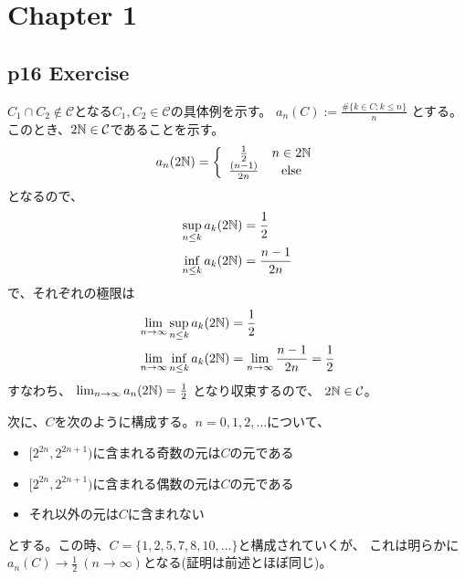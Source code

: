 
\section{Chapter 1}
    \subsection{p16 Exercise}
        $C_1\cap C_2\not\in\mathcal{C}$となる$C_1, C_2\in\mathcal{C}$の具体例を示す。
        $a_n(C) := \frac{\#\{k\in C; k\leq n\}}{n}$
        とする。このとき、$2{\mathbb{N}}\in\mathcal{C}$であることを示す。
        \begin{align*}
            a_n(2{\mathbb{N}}) = \left \{
            \begin{array}{cc}
                \frac{1}{2} & n\in 2{\mathbb{N}}\\
                \frac{(n-1)}{2 n} & \mathrm{else}
            \end{array}
            \right.
        \end{align*}
        となるので、
        \begin{align*}
            \sup_{n\leq k} a_k(2{\mathbb{N}}) &= \frac{1}{2} \\
            \inf_{n\leq k} a_k(2{\mathbb{N}}) &= \frac{n-1}{2n}
        \end{align*}
        で、それぞれの極限は
        \begin{align*}
            \lim_{n\to\infty}\sup_{n\leq k} a_k(2{\mathbb{N}}) &= \frac{1}{2} \\
            \lim_{n\to\infty}\inf_{n\leq k} a_k(2{\mathbb{N}}) &= \lim_{n\to\infty}\frac{n-1}{2n} = \frac{1}{2}
        \end{align*}
        すなわち、
        $\lim_{n\to\infty} a_n(2{\mathbb{N}}) = \frac{1}{2}$
        となり収束するので、
        $2{\mathbb{N}}\in\mathcal{C}$。

        次に、$C$を次のように構成する。$n = 0,1,2,\ldots$について、
        \begin{itemize}
            \item $[2^{2n}, 2^{2n + 1})$に含まれる奇数の元は$C$の元である
            \item $[2^{2n}, 2^{2n + 1})$に含まれる偶数の元は$C$の元である
            \item それ以外の元は$C$に含まれない
        \end{itemize}
        とする。この時、$C = \{1,2,5,7,8,10,\ldots\}$と構成されていくが、
        これは明らかに$a_n(C)\to\frac{1}{2}\ (n\to\infty)$となる(証明は前述とほぼ同じ)。
            
